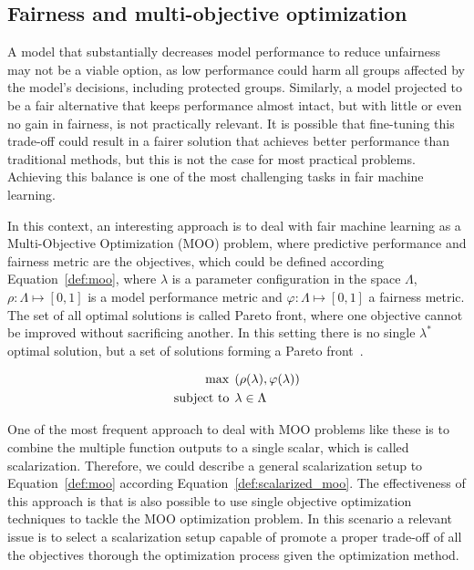 \subsection{Fairness and multi-objective optimization}

A model that substantially decreases model performance to reduce unfairness may not be a viable option, as low performance could harm all groups affected by the model's decisions, including protected groups. Similarly, a model projected to be a fair alternative that keeps performance almost intact, but with little or even no gain in fairness, is not practically relevant. It is possible that fine-tuning this trade-off could result in a fairer solution that achieves better performance than traditional methods, but this is not the case for most practical problems. Achieving this balance is one of the most challenging tasks in fair machine learning.

In this context, an interesting approach is to deal with fair machine learning as a Multi-Objective Optimization (MOO) problem, where predictive performance and fairness metric are the objectives, which could be defined according Equation~\ref{def:moo}, where $\lambda$ is a parameter configuration in the space $\Lambda$, $\rho: \Lambda \mapsto [0,1]$ is a model performance metric and $\varphi: \Lambda \mapsto [0,1]$ a fairness metric. The set of all optimal solutions is called Pareto front, where one objective cannot be improved without sacrificing another. In this setting there is no single $\lambda^*$ optimal solution, but a set of solutions forming a Pareto front~\citep{pareto1906manuale}.

\begin{align}\label{def:moo}
\max &\hspace{1ex} (\rho(\lambda), \varphi(\lambda)) \\
\text{subject to} &\hspace{1ex} \lambda\in\Lambda \nonumber
\end{align}

One of the most frequent approach to deal with MOO problems like these is to combine the multiple function outputs to a single scalar, which is called scalarization. Therefore, we could describe a general scalarization setup to Equation~\ref{def:moo} according Equation~\ref{def:scalarized_moo}. The effectiveness of this approach is that is also possible to use single objective optimization techniques to tackle the MOO optimization problem. In this scenario a relevant issue is to select a scalarization setup capable of promote a proper trade-off of all the objectives thorough the optimization process given the optimization method.

